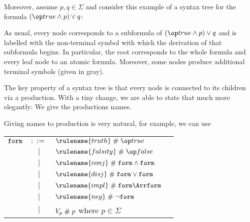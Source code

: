 Moreover, assume $p,q\in\Sigma$ and consider this example of a syntax tree for the formula $(\true\wedge p) \vee q$:

\begin{center}
\end{center}

As usual, every node corresponds to a subformula of $(\true\wedge p) \vee q$ and is labelled with the non-terminal symbol with which the derivation of that subformula begins. In particular, the root corresponds to the whole formula and every leaf node to an atomic formula. Moreover, some nodes produce additional terminal symbols (given in gray).

The key property of a syntax tree is that every node is connected to its children via a production. With a tiny change, we are able to state that much more elegantly: We give the productions names.

Giving names to production is very natural, for example, we can use

\begin{center}
\begin{tabular}{lcl@{\tb}l}
$\mathtt{form}$ & $::=$ & $\rulename{truth} \rnsep \true$ & \\
     &  $|$  & $\rulename{falsity} \rnsep\false$ &  \\
     &  $|$  & $\rulename{conj} \rnsep \FORM \wedge \FORM$ &  \\
     &  $|$  & $\rulename{disj} \rnsep \FORM \vee \FORM$ &  \\
     &  $|$  & $\rulename{impl} \rnsep \FORM \impl \FORM$ &  \\
     &  $|$  & $\rulename{neg} \rnsep \neg \FORM$ & \\
     &  $|$  & $V_p \;\#\; p$ where $p\in\Sigma$ \\
\end{tabular}
\end{center}

